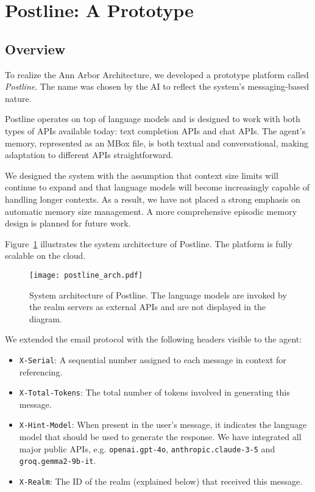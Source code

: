 \section{Postline: A Prototype}

\subsection{Overview}

To realize the Ann Arbor Architecture, we developed a prototype platform called \emph{Postline}. The name was chosen by the AI to reflect the system’s messaging-based nature.

Postline operates on top of language models and is designed to work with both types of APIs available today: text completion APIs and chat APIs. The agent's memory, represented as an MBox file, is both textual and conversational, making adaptation to different APIs straightforward.

We designed the system with the assumption that context size limits will continue to expand and that language models will become increasingly capable of handling longer contexts. As a result, we have not placed a strong emphasis on automatic memory size management. A more comprehensive episodic memory design is planned for future work.

Figure~\ref{fig:postline_arch} illustrates the system architecture of Postline. The platform is fully scalable on the cloud.

\begin{figure}[h]
    \centering
    \texttt{[image: postline\_arch.pdf]}
    \caption{System architecture of Postline. The language models are invoked by the realm servers as external APIs and are not displayed in the diagram.}
    \label{fig:postline_arch}
\end{figure}

We extended the email protocol with the following headers visible to the agent:
\begin{itemize}
    \item \texttt{X-Serial}: A sequential number assigned to each message in context for referencing.
    \item \texttt{X-Total-Tokens}: The total number of tokens involved in generating this message.
    \item \texttt{X-Hint-Model}: When present in the user's message, it indicates the language model that should be used to generate the response.  We have integrated all major public APIs, e.g. \texttt{openai.gpt-4o}, \texttt{anthropic.claude-3-5} and \texttt{groq.gemma2-9b-it}.
    \item \texttt{X-Realm}: The ID of the realm (explained below) that received this message.
\end{itemize}


